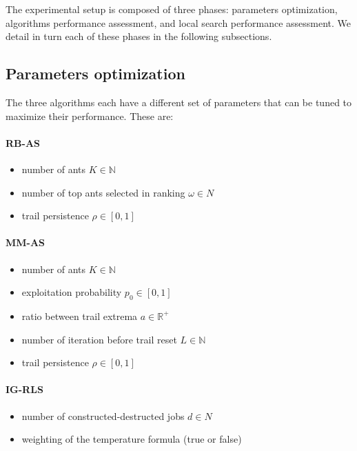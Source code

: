 \documentclass[runningheads]{llncs}
\begin{document}
The experimental setup is composed of three phases: parameters optimization,
algorithms performance assessment, and local search performance assessment.
We detail in turn each of these phases in the following subsections.

\subsection{Parameters optimization}

The three algorithms each have a different set of parameters that can be tuned
to maximize their performance. These are:

\paragraph{RB-AS}
\begin{itemize}
	\item number of ants $K\in\mathbb{N}$
	\item number of top ants selected in ranking $\omega\in N$
	\item trail persistence $\rho\in[0,1]$
\end{itemize}

\paragraph{MM-AS}
\begin{itemize}
	\item number of ants $K\in\mathbb{N}$
	\item exploitation probability $p_0\in[0,1]$
	\item ratio between trail extrema $a\in\mathbb{R^+}$
	\item number of iteration before trail reset $L\in\mathbb{N}$
	\item trail persistence $\rho\in[0,1]$
\end{itemize}

\paragraph{IG-RLS}
\begin{itemize}
	\item number of constructed-destructed jobs $d\in N$
	\item weighting of the temperature formula (true or false)
\end{itemize}
\end{document}
